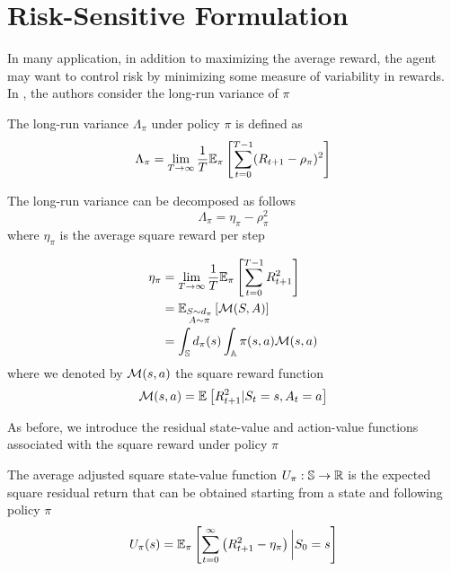\section{Risk-Sensitive Formulation}
\label{sec:risk_sensitive_formulation}
In many application, in addition to maximizing the average reward, the agent
may want to control risk by minimizing some measure of variability in rewards.
In \cite{prashanth2014actor}, the authors consider the long-run variance of $\pi$
\begin{definition}
	The long-run variance $\Lambda_\pi$ under policy $\pi$ is defined as
	\begin{equation}
		\begin{split}
			\Lambda_\pi &= \lim_{T \to \infty} \frac{1}{T} \E[\pi]{
			\sum^{T-1}_{t=0} (R_{t+1} - \rho_\pi)^2}\\
		\end{split}
	\end{equation}
\end{definition}
The long-run variance can be decomposed as follows
\begin{equation}
	\Lambda_\pi = \eta_\pi - \rho_\pi^2 
\end{equation}
where $\eta_\pi$ is the average square reward per step  
\begin{definition}
	\begin{equation}
		\begin{split}
			\eta_\pi &= \lim_{T\to\infty}\frac{1}{T}\E[\pi]{\sum_{t=0}^{T-1} R_{t+1}^2}\\
					 &= \E[\substack{S\sim d_\pi \\ A \sim \pi}]{\calM(S,A)}\\	
					 &= \int_\S d_\pi(s) \int_\A \pi(s,a) \calM(s,a)\\
		\end{split}
	\end{equation}
	where we denoted by $\calM(s,a)$ the square reward function
	\begin{equation}
		\calM(s,a) = \E{R_{t+1}^2 | S_t = s, A_t = a}
	\end{equation}
\end{definition}
As before, we introduce the residual state-value and action-value functions 
associated with the square reward under policy $\pi$
\begin{definition}
	The average adjusted square state-value function $U_\pi : \S \to \R$ is the
	expected square residual return that can be obtained starting from a state 
	and following policy $\pi$
	\begin{equation}
		U_\pi(s) = \E[\pi]{\sum^{\infty}_{t=0} \left(R_{t+1}^2 - \eta_\pi\right)
		\bigg| S_0 = s}
	\end{equation}
\end{definition}
